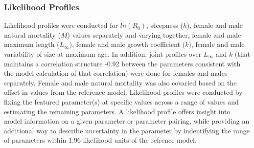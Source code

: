 \documentclass[11pt,
  english,
  a4paper,
]{article}
\begin{document}
\leavevmode\tagmcend\tagstructend\par


\hypertarget{likelihood-profiles}{%
\subsubsection{Likelihood Profiles}\label{likelihood-profiles}}

\leavevmode\tagmcend\tagstructend


Likelihood profiles were conducted for {\(ln(R_0)\)\leavevmode\tagmcend\tagstructend}, steepness ({\(h\)\leavevmode\tagmcend\tagstructend}), female and male natural mortality ({\(M\)\leavevmode\tagmcend\tagstructend}) values separately and varying together, female and male maximum length ({\(L_{\infty}\)\leavevmode\tagmcend\tagstructend}), female and male growth coefficient ({\(k\)\leavevmode\tagmcend\tagstructend}), female and male variability of size at maximum age. In addition, joint profiles over {\(L_{\infty}\)\leavevmode\tagmcend\tagstructend} and {\(k\)\leavevmode\tagmcend\tagstructend} (that maintains a correlation structure -0.92 between the parameters consistent with the model calculation of that correlation) were done for females and males separately. Female and male natural mortality was also covaried based on the offset in values from the reference model. Likelihood profiles were conducted by fixing the featured parameter(s) at specific values across a range of values and estimating the remaining parameters. A likelihood profile offers insight into model information on a given parameter or parameter pairing, while providing an additional way to describe uncertainty in the parameter by indentifying the range of parameters within 1.96 likelihood units of the refrence model.

\leavevmode\tagmcend\tagstructend\par

\end{document}
